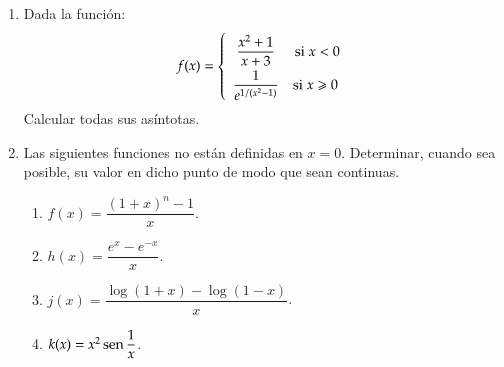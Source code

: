 \begin{enumerate}[leftmargin=*]
\item Dada la función:
\[
\renewcommand{\arraystretch}{2}
f(x) = \left\{
\begin{array}{*{20}c}{
\dfrac{{x^2  + 1}}{{x + 3}}} & {\text{si}\;x < 0}  \\
{\dfrac{1}{{e^{1/(x^2  - 1)} }}} & {\text{si}\;x \geqslant 0\;}  \\
\end{array} 
\right.
\]
Calcular todas sus asíntotas.

\item  Las siguientes funciones no están definidas en $x=0$.
Determinar, cuando sea posible, su valor en dicho punto de modo que sean continuas.
\begin{multicols}{2}
\begin{enumerate}
\item  $f(x)=\dfrac{(1+x)^n-1}{x}$.
\item  $h(x)=\dfrac{e^x-e^{-x}}{x}$.
\item  $j(x)=\dfrac{\log(1+x)-\log(1-x)}{x}$.
\item  $k(x)=x^2\operatorname{sen}\dfrac{1}{x}$.
\end{enumerate}
\end{multicols}

\end{enumerate}
